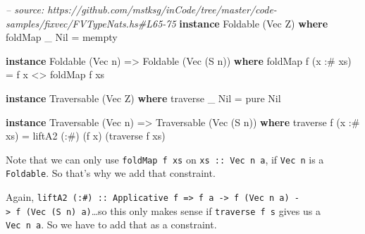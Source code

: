 \documentclass[]{article}
\newenvironment{Shaded}{}{}
\newcommand{\KeywordTok}[1]{\textcolor[rgb]{0.00,0.44,0.13}{\textbf{#1}}}
\newcommand{\DataTypeTok}[1]{\textcolor[rgb]{0.56,0.13,0.00}{#1}}
\newcommand{\CommentTok}[1]{\textcolor[rgb]{0.38,0.63,0.69}{\textit{#1}}}
\newcommand{\OtherTok}[1]{\textcolor[rgb]{0.00,0.44,0.13}{#1}}
\newcommand{\FunctionTok}[1]{\textcolor[rgb]{0.02,0.16,0.49}{#1}}
\newcommand{\NormalTok}[1]{#1}
\begin{document}
\begin{Shaded}
\begin{Highlighting}[]
\CommentTok{-- source: https://github.com/mstksg/inCode/tree/master/code-samples/fixvec/FVTypeNats.hs#L65-75}
\KeywordTok{instance} \DataTypeTok{Foldable}\NormalTok{ (}\DataTypeTok{Vec} \DataTypeTok{Z}\NormalTok{) }\KeywordTok{where}
\NormalTok{    foldMap _ }\DataTypeTok{Nil} \FunctionTok{=}\NormalTok{ mempty}

\KeywordTok{instance} \DataTypeTok{Foldable}\NormalTok{ (}\DataTypeTok{Vec}\NormalTok{ n) }\OtherTok{=>} \DataTypeTok{Foldable}\NormalTok{ (}\DataTypeTok{Vec}\NormalTok{ (}\DataTypeTok{S}\NormalTok{ n)) }\KeywordTok{where}
\NormalTok{    foldMap f (x }\FunctionTok{:#}\NormalTok{ xs) }\FunctionTok{=}\NormalTok{ f x }\FunctionTok{<>}\NormalTok{ foldMap f xs}

\KeywordTok{instance} \DataTypeTok{Traversable}\NormalTok{ (}\DataTypeTok{Vec} \DataTypeTok{Z}\NormalTok{) }\KeywordTok{where}
\NormalTok{    traverse _ }\DataTypeTok{Nil} \FunctionTok{=}\NormalTok{ pure }\DataTypeTok{Nil}

\KeywordTok{instance} \DataTypeTok{Traversable}\NormalTok{ (}\DataTypeTok{Vec}\NormalTok{ n) }\OtherTok{=>} \DataTypeTok{Traversable}\NormalTok{ (}\DataTypeTok{Vec}\NormalTok{ (}\DataTypeTok{S}\NormalTok{ n)) }\KeywordTok{where}
\NormalTok{    traverse f (x }\FunctionTok{:#}\NormalTok{ xs) }\FunctionTok{=}\NormalTok{ liftA2 (}\FunctionTok{:#}\NormalTok{) (f x) (traverse f xs)}
\end{Highlighting}
\end{Shaded}

Note that we can only use \texttt{foldMap\ f\ xs} on \texttt{xs\ ::\ Vec\ n\ a},
if \texttt{Vec\ n} is a \texttt{Foldable}. So that's why we add that constraint.

Again,
\texttt{liftA2\ (:\#)\ ::\ Applicative\ f\ =\textgreater{}\ f\ a\ -\textgreater{}\ f\ (Vec\ n\ a)\ -\textgreater{}\ f\ (Vec\ (S\ n)\ a)}\ldots{}so
this only makes sense if \texttt{traverse\ f\ s} gives us a \texttt{Vec\ n\ a}.
So we have to add that as a constraint.
\end{document}
